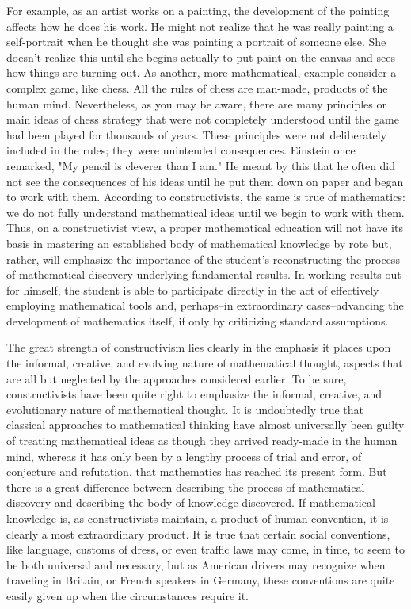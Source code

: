 For example, as an artist works on a painting, the development of the painting affects how he does his work.  He might not realize that he was really painting a self-portrait when he thought she was painting a portrait of someone else.  She  doesn't realize this until she begins actually to put paint on the canvas and sees how things are turning out.  As another, more mathematical, example consider a complex game, like chess.  All the rules of chess are man-made, products of the human mind.  Nevertheless, as you may be aware, there are many principles or main ideas of chess strategy that were not completely understood until the game had been played for thousands of years.  These principles were not deliberately included in the rules; they were unintended consequences.  Einstein once remarked, "My pencil is cleverer than I am."  He meant by this that he often did not see the consequences of his ideas until he put them down on paper and began to work with them.  According to constructivists, the same is true of mathematics:  we do not fully understand mathematical ideas until we begin to work with them.  Thus, on a constructivist view, a proper mathematical education will not have its basis in mastering an established body of mathematical knowledge by rote but, rather, will emphasize the importance of the student's reconstructing the process of mathematical discovery underlying fundamental results.  In working results out for himself, the student is able to participate directly in the act of effectively employing mathematical tools and, perhaps--in extraordinary cases--advancing the development of mathematics itself, if only by criticizing standard assumptions.

The great strength of constructivism lies clearly in the emphasis it places upon the informal, creative, and evolving nature of mathematical thought, aspects that are all but neglected by the approaches considered earlier.  To be sure, constructivists have been quite right to emphasize the informal, creative, and evolutionary nature of mathematical thought.  It is undoubtedly true that classical approaches to mathematical thinking have almost universally been guilty of treating mathematical ideas as though they arrived ready-made in the human mind, whereas it has only been by a lengthy process of trial and error, of conjecture and refutation, that mathematics has reached its present form.  But there is a great difference between describing the process of mathematical discovery and describing the body of knowledge discovered.  If mathematical knowledge is, as constructivists maintain, a product of human convention, it is clearly a most extraordinary product.  It is true that certain social conventions, like language, customs of dress, or even traffic laws may come, in time, to seem to be both universal and necessary, but as American drivers may recognize when traveling in Britain, or French speakers in Germany, these conventions are quite easily given up when the circumstances require it.  

